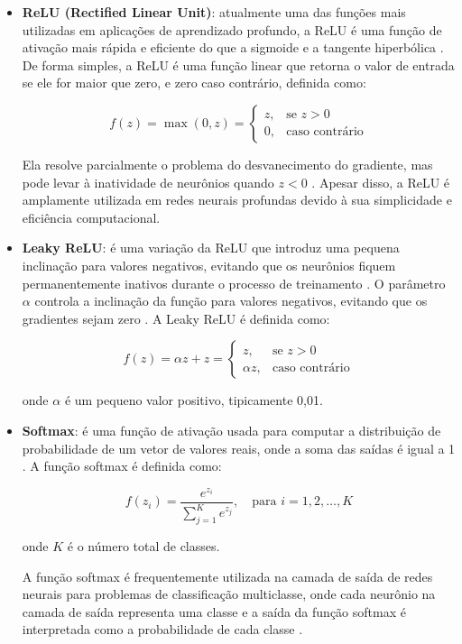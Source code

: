 \begin{itemize}
    \item \textbf{ReLU (Rectified Linear Unit)}: atualmente uma das funções mais utilizadas em aplicações de aprendizado profundo, a ReLU é uma função de ativação mais rápida e eficiente do que a sigmoide e a tangente hiperbólica \citep{Nair2010}. De forma simples, a ReLU é uma função linear que retorna o valor de entrada se ele for maior que zero, e zero caso contrário, definida como:
    
    \[
    f(z) = \max(0, z) =
    \begin{cases}
        z, & \text{se } z > 0 \\
        0, & \text{caso contrário}
    \end{cases}
    \]

    Ela resolve parcialmente o problema do desvanecimento do gradiente, mas pode levar à inatividade de neurônios quando $z < 0$ \citep{Dubey2022}. Apesar disso, a ReLU é amplamente utilizada em redes neurais profundas devido à sua simplicidade e eficiência computacional.

    \item \textbf{Leaky ReLU}: é uma variação da ReLU que introduz uma pequena inclinação para valores negativos, evitando que os neurônios fiquem permanentemente inativos durante o processo de treinamento \citep{Maas2013}. O parâmetro $\alpha$ controla a inclinação da função para valores negativos, evitando que os gradientes sejam zero \citep{nwankpa2018activation}. A Leaky ReLU é definida como:
    
    \[
    f(z) = \alpha z + z =
    \begin{cases}
    z, & \text{se } z > 0 \\
    \alpha z, & \text{caso contrário}
    \end{cases}
    \]

    onde $\alpha$ é um pequeno valor positivo, tipicamente 0{,}01.

    \item \textbf{Softmax}: é uma função de ativação usada para computar a distribuição de probabilidade de um vetor de valores reais, onde a soma das saídas é igual a 1 \citep{nwankpa2018activation}. A função softmax é definida como:
    
    \[
    f(z_i) = \frac{e^{z_i}}{\sum_{j=1}^{K} e^{z_j}}, \quad \text{para } i = 1, 2, \dots, K
    \]

    onde $K$ é o número total de classes.

    A função softmax é frequentemente utilizada na camada de saída de redes neurais para problemas de classificação multiclasse, onde cada neurônio na camada de saída representa uma classe e a saída da função softmax é interpretada como a probabilidade de cada classe \citep{nwankpa2018activation}.

\end{itemize}

